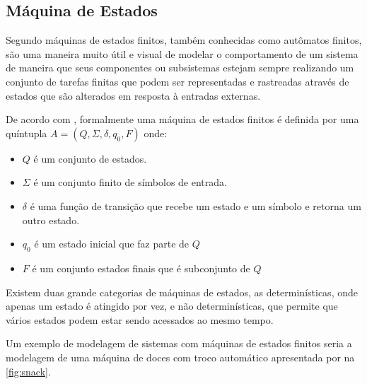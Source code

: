 


\subsection{Máquina de Estados}

Segundo  máquinas de estados finitos, também conhecidas como autômatos finitos, são uma maneira muito útil e visual de modelar o comportamento de um sistema de maneira que seus componentes ou subsistemas estejam sempre realizando um conjunto de tarefas finitas que podem ser representadas e rastreadas através de estados que são alterados em resposta à entradas externas. 

De acordo com , formalmente uma máquina de estados finitos é definida por uma quíntupla $A = (Q, \Sigma, \delta, q_0, F)$ onde:

\begin{itemize}
    \item $Q$ é um conjunto de estados.
    \item $\Sigma$ é um conjunto finito de símbolos de entrada.
    \item $\delta$ é uma função de transição que recebe um estado e um símbolo e retorna um outro estado.
    \item $q_0$ é um estado inicial que faz parte de $Q$
    \item $F$ é um conjunto estados finais que é subconjunto de $Q$ 
\end{itemize}

Existem duas grande categorias de máquinas de estados, as determinísticas, onde apenas um estado é atingido por vez, e não determinísticas, que permite que vários estados podem estar sendo acessados ao mesmo tempo. \cite{hopcroft:2001}

Um exemplo de modelagem de sistemas com máquinas de estados finitos seria a modelagem de uma máquina de doces com troco automático apresentada por \cite{snack} na \autoref{fig:snack}.

